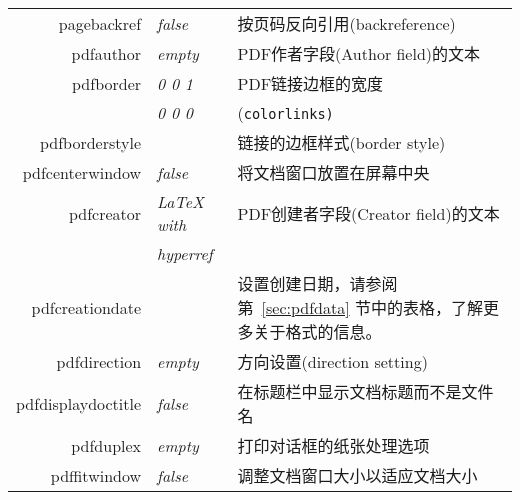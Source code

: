 \documentclass{article}
\begin{document}
\begin{longtable}{@{}>{\ttfamily}rlp{7cm}@{}}
  pagebackref                       & \textit{false}         & 按页码反向引用(backreference)                                                                          \\
  pdfauthor                         & \textit{empty}         & PDF作者字段(Author field)的文本                                                                        \\
  pdfborder                         & \textit{0 0 1}         & PDF链接边框的宽度                                                                                      \\
                                    & \textit{0 0 0}         & (\texttt{colorlinks)}                                                                           \\
  pdfborderstyle                    &                        & 链接的边框样式(border style)                                                                           \\
  pdfcenterwindow                   & \textit{false}         & 将文档窗口放置在屏幕中央                                                                                    \\
  pdfcreator                        & \textit{LaTeX with}    & PDF创建者字段(Creator field)的文本                                                                      \\
                                    & \textit{hyperref}      &                                                                                                 \\
  pdfcreationdate                   &                        & 设置创建日期，请参阅第~\ref{sec:pdfdata} 节中的表格，了解更多关于格式的信息。  \\
  pdfdirection                      & \textit{empty}         & 方向设置(direction setting)                                                                         \\
  pdfdisplaydoctitle                & \textit{false}         & 在标题栏中显示文档标题而不是文件名                                                                               \\
  pdfduplex                         & \textit{empty}         & 打印对话框的纸张处理选项                                                                                    \\
  pdffitwindow                      & \textit{false}         & 调整文档窗口大小以适应文档大小                                                                                 \\

\end{longtable}
\end{document}

